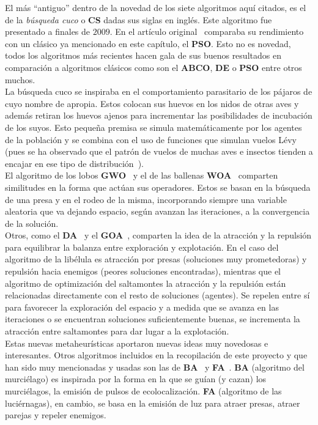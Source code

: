 El más ``antiguo'' dentro de la novedad de los siete algoritmos aquí citados, es el de la \textit{búsqueda cuco} o \textbf{CS} dadas sus siglas en inglés. Este algoritmo fue presentado a finales de $2009$. En el artículo original~\cite{yang_cuckoo_2010} comparaba su rendimiento con un clásico ya mencionado en este capítulo, el \textbf{PSO}. Esto no es novedad, todos los algoritmos más recientes hacen gala de sus buenos resultados en comparación a algoritmos clásicos como son el \textbf{ABCO}, \textbf{DE} o \textbf{PSO} entre otros muchos.\\[6pt]
La búsqueda cuco se inspiraba en el comportamiento parasitario de los pájaros de cuyo nombre de apropia. Estos colocan sus huevos en los nidos de otras aves y además retiran los huevos ajenos para incrementar las posibilidades de incubación de los suyos. Esto pequeña premisa se simula matemáticamente por los agentes de la población y se combina con el uso de funciones que simulan vuelos Lévy (pues se ha observado que el patrón de vuelos de muchas aves e insectos tienden a encajar en ese tipo de distribución~\cite{GUY2008585}).\\[6pt]
El algoritmo de los lobos \textbf{GWO}~\cite{mirjalili_grey_2014} y el de las ballenas \textbf{WOA}~\cite{mirjalili_whale_2016} comparten similitudes en la forma que actúan sus operadores. Estos se basan en la búsqueda de una presa y en el rodeo de la misma, incorporando siempre una variable aleatoria que va dejando espacio, según avanzan las iteraciones, a la convergencia de la solución.\\[6pt]
Otros, como el \textbf{DA}~\cite{mirjalili_dragonfly_2016} y el \textbf{GOA}~\cite{saremi_grasshopper_2017}, comparten la idea de la atracción y la repulsión para equilibrar la balanza entre exploración y explotación. En el caso del algoritmo de la libélula es atracción por presas (soluciones muy prometedoras) y repulsión hacia enemigos (peores soluciones encontradas), mientras que el algoritmo de optimización del saltamontes la atracción y la repulsión están relacionadas directamente con el resto de soluciones (agentes). Se repelen entre sí para favorecer la exploración del espacio y a medida que se avanza en las iteraciones o se encuentran soluciones suficientemente buenas, se incrementa la atracción entre saltamontes para dar lugar a la explotación.\\[6pt]
Estas nuevas metaheurísticas aportaron nuevas ideas muy novedosas e interesantes.
Otros algoritmos incluidos en la recopilación de este proyecto y que han sido muy mencionadas y usadas son las de \textbf{BA}~\cite{yang_new_2010} y \textbf{FA}~\cite{yang_chapter_2014}. \textbf{BA} (algoritmo del murciélago) es inspirada por la forma en la que se guían (y cazan) los murciélagos, la emisión de pulsos de ecolocalización. \textbf{FA} (algoritmo de las luciérnagas), en cambio, se basa en la emisión de luz para atraer presas, atraer parejas y repeler enemigos.\\[6pt]
